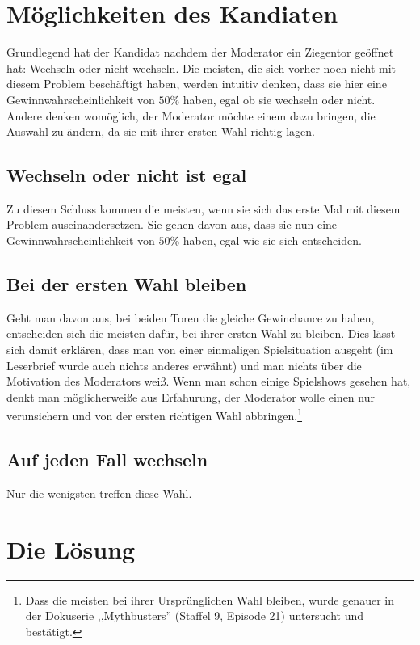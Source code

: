 \section{Möglichkeiten des Kandiaten}

Grundlegend hat der Kandidat nachdem der Moderator ein Ziegentor geöffnet hat: Wechseln oder nicht wechseln. Die meisten, die sich vorher noch nicht mit diesem Problem beschäftigt haben, werden intuitiv denken, dass sie hier eine Gewinnwahrscheinlichkeit von $50\%$ haben, egal ob sie wechseln oder nicht. Andere denken womöglich, der Moderator möchte einem dazu bringen, die Auswahl zu ändern, da sie mit ihrer ersten Wahl richtig lagen.

\subsection{Wechseln oder nicht ist egal}

Zu diesem Schluss kommen die meisten, wenn sie sich das erste Mal mit diesem Problem auseinandersetzen. Sie gehen davon aus, dass sie nun eine Gewinnwahrscheinlichkeit von $50\%$ haben, egal wie sie sich entscheiden.

\subsection{Bei der ersten Wahl bleiben}

Geht man davon aus, bei beiden Toren die gleiche Gewinchance zu haben, entscheiden sich die meisten dafür, bei ihrer ersten Wahl zu bleiben. Dies lässt sich damit erklären, dass man von einer einmaligen Spielsituation ausgeht (im Leserbrief wurde auch nichts anderes erwähnt) und man nichts über die Motivation des Moderators weiß. Wenn man schon einige Spielshows gesehen hat, denkt man möglicherweiße aus Erfahurung, der Moderator wolle einen nur verunsichern und von der ersten richtigen Wahl abbringen.\footnote{Dass die meisten bei ihrer Ursprünglichen Wahl bleiben, wurde genauer in der Dokuserie ,,Mythbusters'' (Staffel 9, Episode 21) untersucht und bestätigt.}

\subsection{Auf jeden Fall wechseln}

Nur die wenigsten treffen diese Wahl.

\section{Die Lösung}


